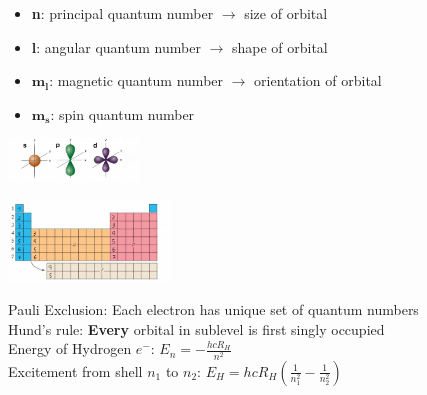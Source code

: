     \begin{itemize}
        \itemsep0em
        \item \textbf{n}: principal quantum number $\rightarrow$ size of orbital
        \item \textbf{l}: angular quantum number $\rightarrow$ shape of orbital
        \item $\boldsymbol{m_l}$: magnetic quantum number $\rightarrow$ orientation of orbital
        \item $\boldsymbol{m_s}$: spin quantum number
    \end{itemize}
    \vspace*{-0.9em}
    
    \begin{minipage}{0.99\linewidth}
      \begin{minipage}{0.45\linewidth}
        \centerline{\includegraphics[width=35mm]{src/2_Atoms/images/orbital_shapes.pdf}}
      \end{minipage}
      \begin{minipage}{0.54\linewidth}
        \centerline{\includegraphics[width=43mm]{src/2_Atoms/images/pse_electron_config.pdf}}
      \end{minipage}
    \end{minipage}
    
    Pauli Exclusion: Each electron has unique set of quantum numbers\\
    Hund's rule: \textbf{Every} orbital in sublevel is first singly occupied\\
    Energy of Hydrogen $e^-$: $E_n = -\frac{hcR_H}{n^2}$\\
    Excitement from shell $n_1$ to $n_2$: $E_H = hcR_H (\frac{1}{n_1^2} - \frac{1}{n_2^2})$